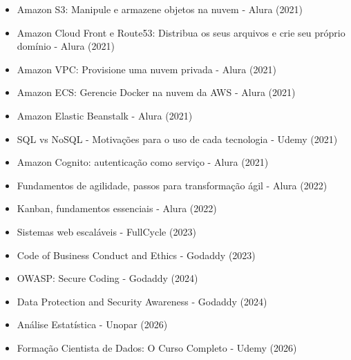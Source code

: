 \begin{itemize}
    \item Amazon S3: Manipule e armazene objetos na nuvem - Alura (2021)
    \item Amazon Cloud Front e Route53: Distribua os seus arquivos e crie seu próprio domínio - Alura (2021)
    \item Amazon VPC: Provisione uma nuvem privada - Alura (2021)
    \item Amazon ECS: Gerencie Docker na nuvem da AWS - Alura (2021)
    \item Amazon Elastic Beanstalk - Alura (2021)
    \item SQL vs NoSQL - Motivações para o uso de cada tecnologia - Udemy (2021)
    \item Amazon Cognito: autenticação como serviço - Alura (2021)
    \item Fundamentos de agilidade, passos para transformação ágil - Alura (2022)
    \item Kanban, fundamentos essenciais - Alura (2022)
    \item Sistemas web escaláveis - FullCycle (2023)
    \item Code of Business Conduct and Ethics - Godaddy (2023)
    \item OWASP: Secure Coding - Godaddy (2024)
    \item Data Protection and Security Awareness - Godaddy (2024)
    \item Análise Estatística - Unopar (2026)
    \item Formação Cientista de Dados: O Curso Completo - Udemy (2026)
\end{itemize}
